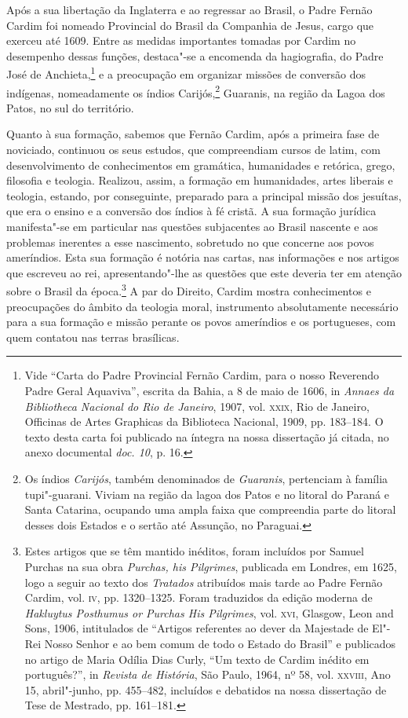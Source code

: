 Após a sua libertação da Inglaterra e ao regressar ao Brasil, o Padre
Fernão Cardim foi nomeado Provincial do Brasil da Companhia de Jesus,
cargo que exerceu até 1609. Entre as medidas importantes tomadas por
Cardim no desempenho dessas funções, destaca"-se a encomenda da
hagiografia, do Padre José de Anchieta,\footnote{ Vide
``Carta do Padre Provincial Fernão Cardim, para o nosso
Reverendo Padre Geral Aquaviva'', escrita da Bahia, a 8 de maio de
1606, in \textit{Annaes da Bibliotheca Nacional do Rio de Janeiro}, 
1907, vol. \textsc{xxix}, Rio de Janeiro, Officinas de Artes Graphicas da
Biblioteca Nacional, 1909, pp. 183--184. O texto desta carta foi
publicado na íntegra na nossa dissertação já citada, no anexo
documental \textit{doc. 10}, p. 16.} e a preocupação em organizar
missões de conversão dos indígenas, nomeadamente os índios
Carijós,\footnote{ Os índios \textit{Carijós}, também denominados
de \textit{Guaranis}, pertenciam à família tupi"-guarani. Viviam na
região da lagoa dos Patos e no litoral do Paraná e Santa Catarina,
ocupando uma ampla faixa que compreendia parte do litoral desses dois
Estados e o sertão até Assunção, no Paraguai.} Guaranis, na região da
Lagoa dos Patos, no sul do território.

Quanto à sua formação, sabemos que Fernão Cardim, após a primeira
fase de noviciado, continuou os seus estudos, que compreendiam cursos
de latim, com desenvolvimento de conhecimentos em gramática,
humanidades e retórica, grego, filosofia e teologia. Realizou, assim, a
formação em humanidades, artes liberais e teologia, estando, por
conseguinte, preparado para a principal missão dos jesuítas, que era o
ensino e a conversão dos índios à fé cristã. A sua formação jurídica
manifesta"-se em particular nas questões subjacentes ao Brasil
nascente e aos problemas inerentes a esse nascimento, sobretudo no que
concerne aos povos ameríndios. Esta sua formação é notória nas cartas,
nas informações e nos artigos que escreveu ao rei,
apresentando"-lhe as questões que este deveria ter em atenção sobre o
Brasil da época.\footnote{ Estes artigos que se têm mantido
inéditos, foram incluídos por Samuel Purchas na sua obra
\textit{Purchas, his Pilgrimes}, publicada em Londres, em 1625, logo a
seguir ao texto dos \textit{Tratados} atribuídos mais tarde ao Padre
Fernão Cardim, vol. \textsc{iv}, pp. 1320--1325. Foram traduzidos da edição
moderna de \textit{Hakluytus Posthumus or Purchas His Pilgrimes}, vol. \textsc{xvi}, 
Glasgow, Leon and Sons, 1906, intitulados de ``Artigos referentes
ao dever da Majestade de El"-Rei Nosso Senhor e ao bem comum de todo o
Estado do Brasil'' e publicados no artigo de Maria Odília Dias Curly,
``Um texto de Cardim inédito em português?'', in \textit{Revista de
História}, São Paulo, 1964, nº 58, vol. \textsc{xxviii}, Ano 15, abril"-junho,
pp. 455--482, incluídos e debatidos na nossa dissertação de Tese de
Mestrado, pp. 161--181.} A par do Direito, Cardim mostra conhecimentos e
preocupações do âmbito da teologia moral, instrumento absolutamente
necessário para a sua formação e missão perante os povos ameríndios e
os portugueses, com quem contatou nas terras brasílicas.

